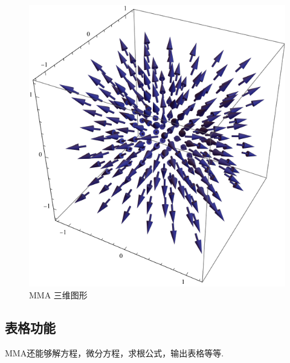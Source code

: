 \documentclass[12pt]{article}
\begin{document}
\begin{figure}[!htb]
    \includegraphics[scale=.7]{MMA3d2.pdf}
    \caption{MMA 三维图形}
    \label{MMA 三维图形}
\end{figure}


\subsection{表格功能}
MMA还能够解方程，微分方程，求根公式，输出表格等等.
\end{document}
